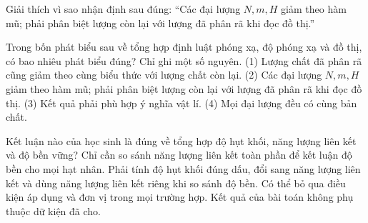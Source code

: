 \begin{bt}
Giải thích vì sao nhận định sau đúng: “Các đại lượng $N,m,H$ giảm theo hàm mũ; phải phân biệt lượng còn lại với lượng đã phân rã khi đọc đồ thị.”
\end{bt}

\begin{ex}
Trong bốn phát biểu sau về tổng hợp định luật phóng xạ, độ phóng xạ và đồ thị, có bao nhiêu phát biểu đúng? Chỉ ghi một số nguyên. (1) Lượng chất đã phân rã cũng giảm theo cùng biểu thức với lượng chất còn lại. (2) Các đại lượng $N,m,H$ giảm theo hàm mũ; phải phân biệt lượng còn lại với lượng đã phân rã khi đọc đồ thị. (3) Kết quả phải phù hợp ý nghĩa vật lí. (4) Mọi đại lượng đều có cùng bản chất.
\end{ex}

\begin{ex}
Kết luận nào của học sinh là đúng về tổng hợp độ hụt khối, năng lượng liên kết và độ bền vững?
\choice
{Chỉ cần so sánh năng lượng liên kết toàn phần để kết luận độ bền cho mọi hạt nhân.}
{\True Phải tính độ hụt khối đúng dấu, đổi sang năng lượng liên kết và dùng năng lượng liên kết riêng khi so sánh độ bền.}
{Có thể bỏ qua điều kiện áp dụng và đơn vị trong mọi trường hợp.}
{Kết quả của bài toán không phụ thuộc dữ kiện đã cho.}
\end{ex}

